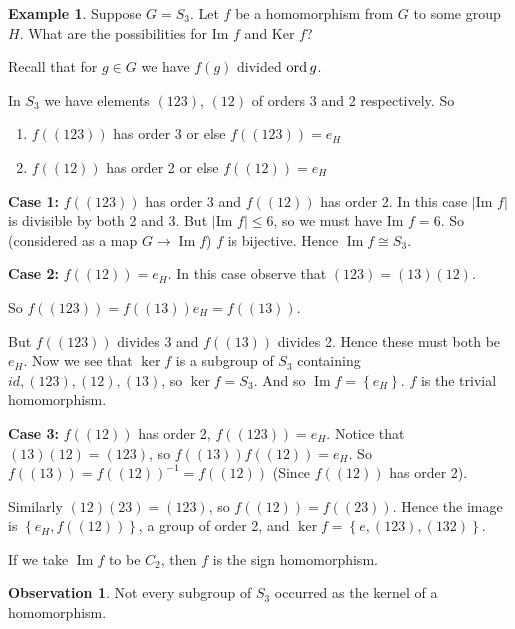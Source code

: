 \documentclass{article}
\theoremstyle{definition} \newtheorem*{definition}{Definition}
\newtheorem*{exmp}{Example} \newtheorem*{exmps}{Examples}
\newtheorem*{obvs}{Observation}
\DeclareMathOperator{\Ima}{Im} \DeclareMathOperator{\Sym}{Sym}
\begin{document}
\begin{exmp} Suppose $G=S_3$. Let $f$ be a homomorphism from $G$ to some group
  $H$. What are the possibilities for $\text{Im }f$ and $\text{Ker }f$?

  Recall that for $g \in G$ we have $f(g)$ divided $\operatorname{\text{ord}} g$.

  In $S_3$ we have elements $(123)$, $(12)$ of orders 3 and 2 respectively. So
\begin{enumerate} \item $f\left( (123) \right)$ has order 3 or else $f\left(
    (123) \right)=e_H$ \item $f\left( (12) \right)$ has order 2 or else
      $f\left( (12) \right)=e_H$ \end{enumerate}

  \textbf{Case 1:} $f\left( (123) \right)$ has order 3 and $f\left(
  (12)\right)$ has order 2. In this case $|\text{Im }f|$ is divisible by both 2
  and 3. But $|\text{Im }f| \leq 6$, so we must have $\text{Im } f=6$. So
  (considered as a map $G \rightarrow \Ima f$) $f$ is bijective. Hence $\Ima f
  \cong S_3$.

  \textbf{Case 2:} $f\left( (12) \right)=e_H$. In this case observe that
  $(123)=(13)(12)$.

  So $f\left( (123) \right)=f\left( (13) \right)e_H=f\left( (13) \right)$.

  But $f\left( (123) \right)$ divides 3 and $f\left( (13) \right)$ divides 2.
  Hence these must both be $e_H$. Now we see that $\ker f$ is a subgroup of
  $S_3$ containing $id, (123), (12), (13)$, so $\ker f=S_3$. And so $\Ima f =
  \left\{ e_H \right\}$. $f$ is the trivial homomorphism.

  \textbf{Case 3:} $f\left( (12) \right)$ has order 2, $f\left( (123)
  \right)=e_H$. Notice that $(13)(12)=(123)$, so $f\left( (13) \right)f\left(
  (12) \right)=e_H$. So $f\left( (13) \right)=f\left( (12) \right)^{-1}=f\left(
  (12) \right)$ (Since $f\left( (12) \right)$ has order 2).

  Similarly $(12)(23)=(123)$, so $f\left( (12) \right)=f\left( (23) \right)$.
  Hence the image is $\left\{ e_H,f\left( (12) \right) \right\}$, a group of
  order 2, and $\ker f=\left\{ e,(123),(132) \right\}$.

  If we take $\Ima f$ to be $C_2$, then $f$ is the sign homomorphism.\\
  \begin{obvs}
  
  Not every subgroup of $S_3$ occurred as the kernel of a homomorphism.
\end{obvs} \end{exmp}
\end{document}
